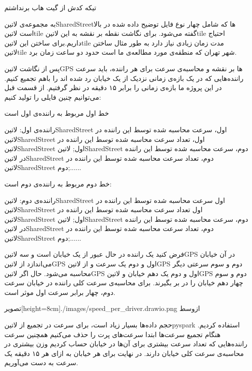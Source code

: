 
تیکه کدش از گیت هاب برنداشتم

به مجموعه‌ی ‌لاتین{SharedStreet}ها که شامل چهار نوع فایل توضیح داده شده در بالا است ‌لاتین{tile} گفته می‌شود. برای نگاشت نقطه بر نقشه به این ‌لاتین{tile} احتیاج داریم.برای ساختن این ‌لاتین{tile} مدت زمان زیادی نیاز دارد به طور مثال ساختن ‌لاتین{tile} شهر تهران که منطقه‌ی مورد مطالعه‌ی ما است حدود دو ساعت زمان برد.


پس از نگاشت ‌لاتین{GPS} ها بر نقشه و محاسبه‌ی سرعت برای هر راننده، باید سرعت راننده‌هایی که در یک بازه‌ی زمانی نزدیک از یک خیابان رد شده اند را باهم تجمیع کنیم. در این پروژه ما بازه‌ی زمانی را برابر ۱۵ دقیقه در نظر گرفتیم. از قسمت قبل می‌توانیم چنین فایلی را تولید کنیم:

خط اول مربوط به راننده‌ی اول است

راننده‌ی اول: ‌لاتین{SharedStreet} اول، سرعت محاسبه شده توسط این راننده در ‌لاتین{SharedStreet} اول، تعداد سرعت محاسبه شده توسط این راننده در ‌لاتین{SharedStreet} اول;  ‌لاتین{SharedStreet} دوم، سرعت محاسبه شده توسط این راننده در ‌لاتین{SharedStreet} دوم، تعداد سرعت محاسبه شده توسط این راننده در ‌لاتین{SharedStreet} دوم;......


خط دوم مربوط به راننده‌ی دوم است:

راننده‌ی دوم: ‌لاتین{SharedStreet} اول سرعت محاسبه شده توسط این راننده در ‌لاتین{SharedStreet} اول تعداد سرعت محاسبه شده توسط این راننده در ‌لاتین{SharedStreet} اول;  ‌لاتین{SharedStreet} دوم، سرعت محاسبه شده توسط این راننده در ‌لاتین{SharedStreet} دوم، تعداد سرعت محاسبه شده توسط این راننده در ‌لاتین{SharedStreet} دوم;......

فرض کنید یک راننده در حال عبور از یک خیابان است و سه ‌لاتین{‌GPS} در آن خیابان می‌اندازد از ‌لاتین{GPS} اول و دوم یک سرعت و از ‌لاتین{‌GPS} دوم و سوم سرعتی دیگر محاسبه می‌شود. حال اگر ‌لاتین{GPS} اول و دوم یک دهم خیابان و ‌لاتین{GPS} دوم و سوم چهار دهم خیابان را در بر بگیرند. برای محاسبه‌ی سرعت کلی راننده در خیابان سرعت دوم، چهار برابر سرعت اول موثر است.

  ‌تصویر[height=8cm]{./images/speed_per_driver.drawio.png}
  ‌ازوسط

حجم داده‌ها بسیار زیاد است، برای سرعت در تجمیع از ‌لاتین{pyspark} استفاده کردیم. هنگام تجمیع سرعت‌ها ابتدا سرعت‌های پرت را حذف می‌کنیم همچنین سرعت راننده‌هایی که تعداد سرعت بیشتری برای آن‌ها در خیابان حساب کردیم وزن بیشتری در محاسبه‌ی سرعت کلی خیابان دارند. در نهایت برای هر خیابان به ازای هر ۱۵ دقیقه یک سرعت به دست می‌آوریم.

